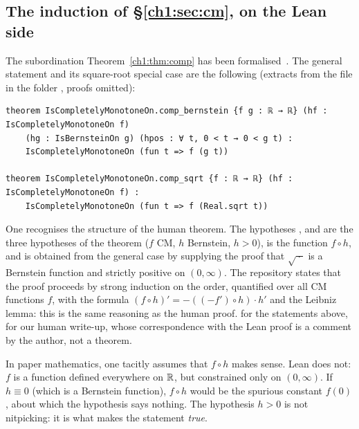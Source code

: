 \subsection{The induction of §\ref{ch1:sec:cm}, on the Lean side}

The subordination Theorem~\ref{ch1:thm:comp} has been formalised~\cite{p3}. The general statement and its square-root special case are the following
(extracts from the file  in the folder \allowbreak{}, proofs omitted):

\begin{leanbox}
\begin{lstlisting}[language=Lean]
theorem IsCompletelyMonotoneOn.comp_bernstein {f g : ℝ → ℝ} (hf : IsCompletelyMonotoneOn f)
    (hg : IsBernsteinOn g) (hpos : ∀ t, 0 < t → 0 < g t) :
    IsCompletelyMonotoneOn (fun t => f (g t))

theorem IsCompletelyMonotoneOn.comp_sqrt {f : ℝ → ℝ} (hf : IsCompletelyMonotoneOn f) :
    IsCompletelyMonotoneOn (fun t => f (Real.sqrt t))
\end{lstlisting}
\end{leanbox}

One recognises the structure of the human theorem. The hypotheses ,  and  are the three
hypotheses of the theorem ($f$ CM, $h$ Bernstein, $h>0$),  is the function $f\circ h$, and  is obtained from the general case by
supplying the proof that $\sqrt{\ \cdot\ }$ is a Bernstein function and strictly positive on $(0,\infty)$. The repository states that the proof proceeds by strong
induction on the order, quantified over all CM functions $f$, with the formula $(f\circ h)'=-((-f')\circ h)\cdot h'$ and the Leibniz lemma: this is
the same reasoning as the human proof. \tierA{} for the statements above, \tierC{} for our human write-up, whose correspondence with the
Lean proof is a comment by the author, not a theorem.

\begin{remark}
In paper mathematics, one tacitly assumes that $f\circ h$ makes sense. Lean does not: $f$ is a function defined everywhere on $\mathbb{R}$, but
constrained only on $(0,\infty)$. If $h\equiv0$ (which is a Bernstein function), $f\circ h$ would be the spurious constant $f(0)$, about which the hypothesis says nothing. The hypothesis
$h>0$ is not nitpicking: it is what makes the statement \emph{true}.
\end{remark}

